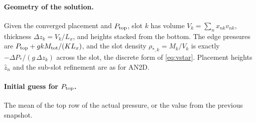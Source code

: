 \documentclass[11pt,a4paper]{article}
\newcommand{\Mtot}{M_{\rm tot}}
\newcommand{\Ptop}{P_{\rm top}}
\newcommand{\zh}{\hat z}
\begin{document}
\paragraph{Geometry of the solution.} Given the converged placement and $\Ptop$, slot $k$ has volume
$V_k=\sum_nx_{nk}v_{nk}$, thickness $\Delta z_k=V_k/L_x$, and heights stacked from the bottom. The edge pressures are
$\Ptop+gk\Mtot/(KL_x)$, and the slot density $\rho_{*,k}=M_k/V_k$ is exactly $-\Delta P_*/(g\,\Delta z_k)$ across the slot,
the discrete form of \eqref{eq:vstar}. Placement heights $\zh_n$ and the sub-slot refinement are as for AN2D.

\paragraph{Initial guess for $\Ptop$.} The mean of the top row of the actual pressure, or the value from the previous snapshot.
\end{document}
